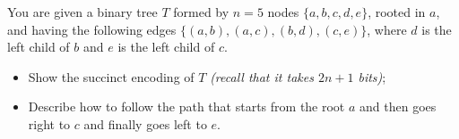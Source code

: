 \exercise

You are given a binary tree $T$ formed by $n = 5$ nodes $\{a, b, c, d, e\}$,
rooted in $a$, and having the following edges $\{(a, b), (a, c), (b, d), (c, e)
\}$, where $d$ is the left child of $b$ and $e$ is the left child of $c$.
%
\begin{itemize}

  \item Show the succinct encoding of $T$ \emph{(recall that it takes $2n + 1$
  bits)};

  \item Describe how to follow the path that starts from the root $a$ and then
  goes right to $c$ and finally goes left to $e$.

\end{itemize}

\solution

